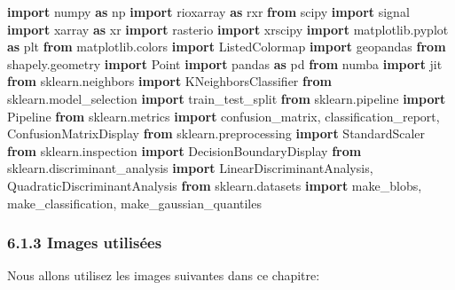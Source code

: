 \documentclass[
]{article}
\newenvironment{Shaded}{}{}
\newcommand{\ImportTok}[1]{\textcolor[rgb]{0.00,0.50,0.00}{\textbf{#1}}}
\newcommand{\NormalTok}[1]{#1}
\begin{document}
\label{d9755cf9}
\label{cb2}
\begin{Shaded}
\begin{Highlighting}[]
\ImportTok{import}\NormalTok{ numpy }\ImportTok{as}\NormalTok{ np}
\ImportTok{import}\NormalTok{ rioxarray }\ImportTok{as}\NormalTok{ rxr}
\ImportTok{from}\NormalTok{ scipy }\ImportTok{import}\NormalTok{ signal}
\ImportTok{import}\NormalTok{ xarray }\ImportTok{as}\NormalTok{ xr}
\ImportTok{import}\NormalTok{ rasterio}
\ImportTok{import}\NormalTok{ xrscipy}
\ImportTok{import}\NormalTok{ matplotlib.pyplot }\ImportTok{as}\NormalTok{ plt}
\ImportTok{from}\NormalTok{ matplotlib.colors }\ImportTok{import}\NormalTok{ ListedColormap}
\ImportTok{import}\NormalTok{ geopandas}
\ImportTok{from}\NormalTok{ shapely.geometry }\ImportTok{import}\NormalTok{ Point}
\ImportTok{import}\NormalTok{ pandas }\ImportTok{as}\NormalTok{ pd}
\ImportTok{from}\NormalTok{ numba }\ImportTok{import}\NormalTok{ jit}
\ImportTok{from}\NormalTok{ sklearn.neighbors }\ImportTok{import}\NormalTok{ KNeighborsClassifier}
\ImportTok{from}\NormalTok{ sklearn.model\_selection }\ImportTok{import}\NormalTok{ train\_test\_split}
\ImportTok{from}\NormalTok{ sklearn.pipeline }\ImportTok{import}\NormalTok{ Pipeline}
\ImportTok{from}\NormalTok{ sklearn.metrics }\ImportTok{import}\NormalTok{ confusion\_matrix, classification\_report, ConfusionMatrixDisplay}
\ImportTok{from}\NormalTok{ sklearn.preprocessing }\ImportTok{import}\NormalTok{ StandardScaler}
\ImportTok{from}\NormalTok{ sklearn.inspection }\ImportTok{import}\NormalTok{ DecisionBoundaryDisplay}
\ImportTok{from}\NormalTok{ sklearn.discriminant\_analysis }\ImportTok{import}\NormalTok{ LinearDiscriminantAnalysis, QuadraticDiscriminantAnalysis}
\ImportTok{from}\NormalTok{ sklearn.datasets }\ImportTok{import}\NormalTok{ make\_blobs, make\_classification, make\_gaussian\_quantiles}
\end{Highlighting}
\end{Shaded}

\subsubsection{\texorpdfstring{{6.1.3} Images
utilisées}{6.1.3 Images utilisées}}\label{images-utilisuxe9es}

Nous allons utilisez les images suivantes dans ce chapitre:
\end{document}
